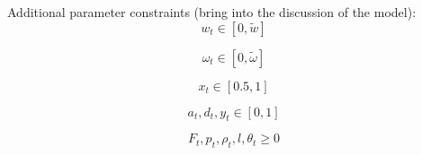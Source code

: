 \documentclass[11pt]{article}
\begin{document}
Additional parameter constraints (bring into the discussion of the model):
\begin{equation}
w_t \in [0,\tilde{w}]
\end{equation}

\begin{equation}
\omega_t \in [0,\tilde{\omega}]
\end{equation}

\begin{equation}
x_t \in [0.5,1]
\end{equation}

\begin{equation}
a_t, d_t, y_t \in [0,1]
\end{equation}

\begin{equation}
F_t, p_t, \rho_t, l, \theta_t \ge 0 
\end{equation}
\end{document}
